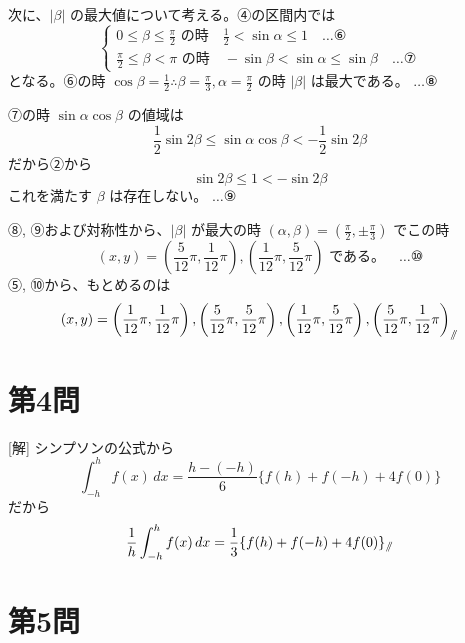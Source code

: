 \documentclass[../main.tex]{subfiles}
\begin{document}
次に、$|\beta|$ の最大値について考える。④の区間内では
\[
  \begin{cases}
    0 \le \beta \le \frac{\pi}{2} \text{ の時} \quad \frac{1}{2} < \sin\alpha \le 1 \quad \dots \text{⑥} \\
    \frac{\pi}{2} \le \beta < \pi \text{ の時} \quad -\sin\beta < \sin\alpha \le \sin\beta \quad \dots \text{⑦}
  \end{cases}
\]
となる。⑥の時 $\cos\beta = \frac{1}{2} \therefore \beta = \frac{\pi}{3}, \alpha = \frac{\pi}{2}$ の時 $|\beta|$ は最大である。 $\dots \text{⑧}$

⑦の時 $\sin\alpha \cos\beta$ の値域は
\[
  \frac{1}{2}\sin 2\beta \le \sin\alpha \cos\beta < -\frac{1}{2}\sin 2\beta
\]
だから②から
\[
  \sin 2\beta \le 1 < -\sin 2\beta
\]
これを満たす $\beta$ は存在しない。 $\dots \text{⑨}$

⑧, ⑨および対称性から、$|\beta|$ が最大の時 $(\alpha, \beta) = (\frac{\pi}{2}, \pm \frac{\pi}{3})$ でこの時
\[
  (x, y) = (\frac{5}{12}\pi, \frac{1}{12}\pi), (\frac{1}{12}\pi, \frac{5}{12}\pi) \text{ である。} \quad \dots \text{⑩}
\]
⑤, ⑩から、もとめるのは
\[
  (x, y) = \left(\frac{1}{12}\pi, \frac{1}{12}\pi\right), \left(\frac{5}{12}\pi, \frac{5}{12}\pi\right), \left(\frac{1}{12}\pi, \frac{5}{12}\pi\right), \left(\frac{5}{12}\pi, \frac{1}{12}\pi\right)_{\mathbin{/\mkern-6mu/}}
\]

\begin{center}
\end{center}

\section*{第4問}

[解] シンプソンの公式から
\[
  \int_{-h}^{h} f(x) \, dx = \frac{h - (-h)}{6} \{ f(h) + f(-h) + 4f(0) \}
\]
だから
\[
  \frac{1}{h} \int_{-h}^{h} f(x) \, dx = \frac{1}{3} \{ f(h) + f(-h) + 4f(0) \}_{\mathbin{/\mkern-6mu/}}
\]

\section*{第5問}
\end{document}
